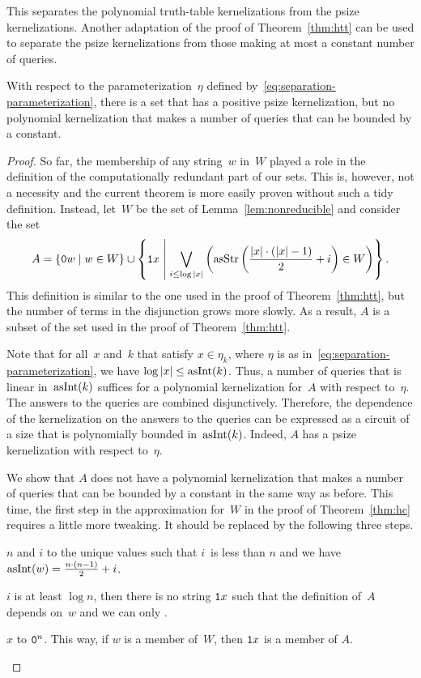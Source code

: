 This separates the polynomial truth-table kernelizations from the psize kernelizations.
Another adaptation of the proof of Theorem~\ref{thm:htt} can be used to separate the psize kernelizations from those making at most a constant number of queries.

\begin{theorem}
\label{thm:hpsize}%
  With respect to the parameterization~$\eta$ defined by~\eqref{eq:separation-parameterization}, there is a set that has a positive psize kernelization, but no polynomial kernelization that makes a number of queries that can be bounded by a constant.
\end{theorem}
\begin{proof}
  So far, the membership of any string~$w$ in~$W$ played a role in the definition of the computationally redundant part of our sets.
  This is, however, not a necessity and the current theorem is more easily proven without such a tidy definition.
  Instead, let~$W$ be the set of Lemma~\ref{lem:nonreducible} and consider the set
  \begin{equation*}
    A \deq \{\bits{0}w \st w \in W\} \cup \left\{\bits{1}x \st[\middle] \bigvee_{i \le \log\length{x}} \left(\asStr\left(\frac{\length{x} \cdot (\length{x} - 1)}{2} + i\right) \in W\right)\right\}.
  \end{equation*}
  This definition is similar to the one used in the proof of Theorem~\ref{thm:htt}, but the number of terms in the disjunction grows more slowly.
  As a result, $A$ is a subset of the set used in the proof of Theorem~\ref{thm:htt}.

  Note that for all~$x$ and~$k$ that satisfy $x \in \eta_k$, where $\eta$ is as in~\eqref{eq:separation-parameterization}, we have $\log \length{x} \le \asNat(k)$.
  Thus, a number of queries that is linear in~$\asNat(k)$ suffices for a polynomial kernelization for~$A$ with respect to~$\eta$.
  The answers to the queries are combined disjunctively.
  Therefore, the dependence of the kernelization on the answers to the queries can be expressed as a circuit of a size that is polynomially bounded in~$\asNat(k)$.
  Indeed, $A$ has a psize kernelization with respect to~$\eta$.

  We show that $A$ does not have a polynomial kernelization that makes a number of queries that can be bounded by a constant in the same way as before.
  This time, the first step in the approximation for~$W$ in the proof of Theorem~\ref{thm:hc} requires a little more tweaking.
  It should be replaced by the following three steps.
  \begin{codelisting}
  \item
     $n$ and $i$ to the unique values such that $i$~is less than $n$ and we have $\asNat(w) = \frac{n \cdot (n - 1)}{2} + i$.
  \item
     $i$ is at least $\log n$, then there is no string $\bits{1}x$ such that the definition of~$A$ depends on~$w$ and we can only  .
  \item
     $x$ to $\bits{0}^n$.
    This way, if $w$ is a member of~$W$, then $\bits{1}x$ is a member of $A$.
  \end{codelisting}


\end{proof}
